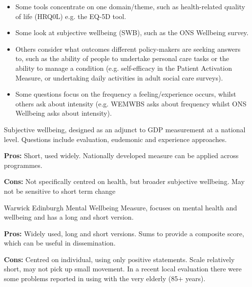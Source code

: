 \begin{itemize}[noitemsep]
    \item Some tools concentrate on one domain/theme, such as health-related quality of life (HRQ0L) e.g. the EQ-5D tool.
    \item Some look at subjective wellbeing (SWB), such as the ONS Wellbeing survey.
    \item Others consider what outcomes different policy-makers are seeking answers to, such as the ability of people to undertake personal care tasks or the ability to manage a condition (e.g. self-efficacy in the Patient Activation Measure, or undertaking daily activities in adult social care surveys).
    \item Some questions focus on the frequency a feeling/experience occurs, whilst others ask about intensity (e.g. WEMWBS asks about frequency whilst ONS Wellbeing asks about intensity).
\end{itemize}


\begin{tcolorbox}[colback={boxcolour}, title={ONS Subjective Wellbeing}]
    Subjective wellbeing, designed as an adjunct to GDP measurement at a national level. Questions include evaluation, eudemonic and experience approaches.
    
    {\bf Pros:} Short, used widely. Nationally developed measure can be applied across programmes.
    
    {\bf Cons:} Not specifically centred on health, but broader subjective wellbeing. May not be sensitive to short term change
\end{tcolorbox}

\begin{tcolorbox}[colback={boxcolour},title={WEMWBS / Warwick Edinburgh}]
    Warwick Edinburgh Mental Wellbeing Measure, focuses on mental health and wellbeing and has a long and short version.

    {\bf Pros:} Widely used, long and short versions. Sums to provide a composite score, which can be useful in dissemination.

    {\bf Cons:} Centred on individual, using only positive statements. Scale relatively short, may not pick up small movement. In a recent local evaluation there were some problems reported in using with the very elderly (85+ years).
\end{tcolorbox}

